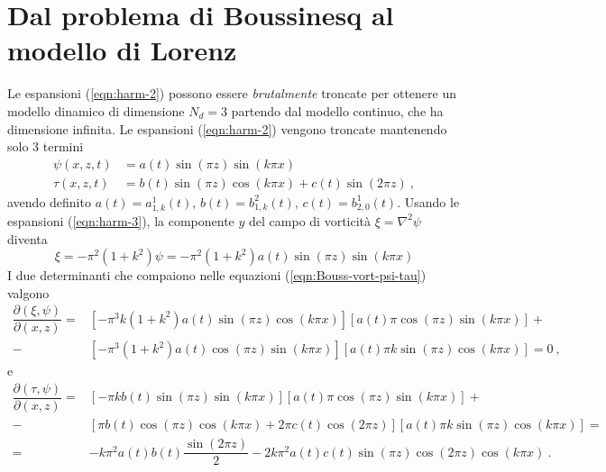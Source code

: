 \documentclass{article}
\begin{document}
\section{Dal problema di Boussinesq al modello di Lorenz}
Le espansioni (\ref{eqn:harm-2}) possono essere \textit{brutalmente} troncate per ottenere un modello dinamico di dimensione $N_d = 3$ partendo dal modello continuo, che ha dimensione infinita. Le espansioni (\ref{eqn:harm-2}) vengono troncate mantenendo solo 3 termini
\begin{equation}\label{eqn:harm-3}
\begin{aligned}
    \psi(x,z,t) & = a(t) \sin{(\pi z)} \sin{(k\pi x )}  \\
    \tau(x,z,t) & = b(t) \sin{(\pi z)} \cos{(k\pi x )} + c(t) \sin{(2 \pi z)}   \ ,
\end{aligned}
\end{equation}
avendo definito $a(t) = a^1_{1,k}(t)$, $b(t) = b^2_{1,k}(t)$, $c(t) = b^1_{2,0}(t)$.
Usando le espansioni (\ref{eqn:harm-3}), la componente $y$ del campo di vorticità $\xi = \nabla^2 \psi$ diventa
\begin{equation}
    \xi = - \pi^2 (1 + k^2) \psi = - \pi^2 (1 + k^2) a(t) \sin{(\pi z)} \sin{(k\pi x )}
\end{equation}
%
I due determinanti che compaiono nelle equazioni (\ref{eqn:Bouss-vort-psi-tau}) valgono
\begin{equation}
\begin{aligned}
     \dfrac{\partial (\xi, \psi)}{\partial (x,z)} = &
     \left[ -\pi^3 k(1+k^2) a(t) \sin{(\pi z)}  \cos{(k \pi x)} \right]
     \left[ a(t) \pi \cos{(\pi z)} \sin{(k \pi x)} \right] + \\
      - & \left[  -\pi^3 (1+k^2) a(t) \cos{(\pi z)}  \sin{(k \pi x)} \right]
      \left[ a(t) \pi k \sin{(\pi z)} \cos{(k \pi x)} \right] = 0 \ ,
\end{aligned}
\end{equation}
e
\begin{equation}
\begin{aligned}
    \dfrac{\partial (\tau, \psi)}{\partial (x,z)} = &
    \left[ - \pi k b(t) \sin{(\pi z )} \sin{(k \pi x)} \right]
    \left[ a(t) \pi \cos{(\pi z)} \sin{(k \pi x)} \right] + \\
    - & \left[ \pi b(t) \cos{(\pi z )} \cos{(k \pi x)} + 2\pi c(t) \cos{(2\pi z)} \right]
    \left[ a(t) \pi k \sin{(\pi z)} \cos{(k \pi x)} \right] = \\
    = & - k \pi^2 a(t) b(t) \dfrac{\sin{( 2 \pi z)}}{2} -
    2 k \pi^2 a(t)c(t) \sin(\pi z) \cos(2\pi z) \cos(k \pi x) \ .
\end{aligned}
\end{equation}
\end{document}
